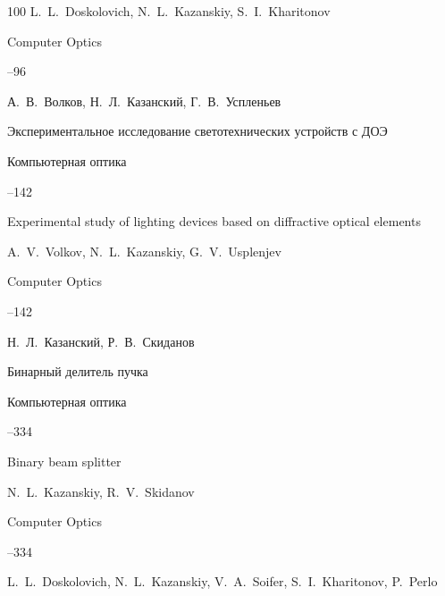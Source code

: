 \begin{thebibliography}{100}
\by L.~L.~Doskolovich, N.~L.~Kazanskiy, S.~I.~Kharitonov 

\jour Computer Optics



--96






\by А.~В.~Волков, Н.~Л.~Казанский, Г.~В.~Успленьев

\paper Экспериментальное исследование светотехнических устройств с ДОЭ

\jour Компьютерная оптика



--142

\misctransl

\paper  Experimental study of lighting devices based on diffractive optical elements 

\by A.~V.~Volkov, N.~L.~Kazanskiy, G.~V.~Usplenjev 

\jour Computer Optics



--142




\by  Н.~Л.~Казанский, Р.~В.~Скиданов

\paper Бинарный делитель пучка

\jour Компьютерная оптика




--334

\misctransl

\paper Binary beam splitter

\by N.~L.~Kazanskiy, R.~V.~Skidanov

\jour Computer Optics




--334








\by  L.~L.~Doskolovich, N.~L.~Kazanskiy, V.~A.~Soifer, S.~I.~Kharitonov, P.~Perlo


\end{thebibliography}
